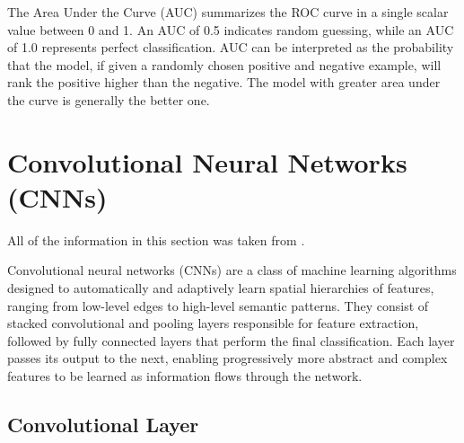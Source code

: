 \documentclass{pracalicmgr}
\begin{document}
The Area Under the Curve (AUC) summarizes the ROC curve in a single scalar value between 0 and 1. An AUC of 0.5 indicates random guessing, while an AUC of 1.0 represents perfect classification. AUC can be interpreted as the probability that the model, if given a randomly chosen positive and negative example, will rank the positive higher than the negative. The model with greater area under the curve is generally the better one.

\chapter{Convolutional Neural Networks (CNNs)}


All of the information in this section was taken from \cite{CNNExplained}.

Convolutional neural networks (CNNs) are a class of machine learning algorithms designed to automatically and adaptively learn spatial hierarchies of features, ranging from low-level edges to high-level semantic patterns. They consist of stacked convolutional and pooling layers responsible for feature extraction, followed by fully connected layers that perform the final classification. Each layer passes its output to the next, enabling progressively more abstract and complex features to be learned as information flows through the network.

\section{Convolutional Layer}
\end{document}
